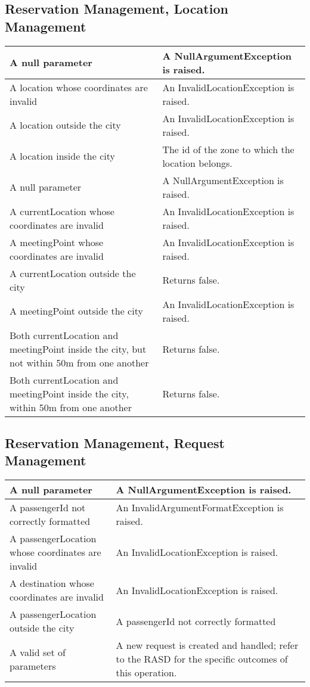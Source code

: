 \subsection{Reservation Management, Location Management}
\begin{tabular}{p{5cm}|p{6cm}}
\hline
	\method{getZone(location)}
	A null parameter &
	A NullArgumentException is raised.\\\hline
	A location whose coordinates are invalid &
	An InvalidLocationException is raised. \\\hline
	A location outside the city &
	An InvalidLocationException is raised. \\\hline
	A location inside the city &
	The id of the zone to which the location belongs. \\\hline
			
	\method{checkTaxiDriverLocation(currentLocation, meetingPoint)}
	A null parameter &
	A NullArgumentException is raised. \\\hline
	A currentLocation whose coordinates are invalid &
	An InvalidLocationException is raised. \\\hline
	A meetingPoint whose coordinates are invalid &
	An InvalidLocationException is raised. \\\hline
	A currentLocation outside the city &
	Returns false. \\\hline
	A meetingPoint outside the city & 
	An InvalidLocationException is raised. \\\hline
	Both currentLocation and meetingPoint inside the city, but not within 50m from one another &
	Returns false. \\\hline
	Both currentLocation and meetingPoint inside the city, within 50m  from one another &
	Returns false. \\\hline\hline
\end{tabular}


\subsection{Reservation Management, Request Management}
\begin{tabular}{p{5cm}|p{6cm}}
\hline
	\method{requestTaxi(passengerId, passengerLocation, destination)}
	A null parameter &
	A NullArgumentException is raised.\\\hline
	A passengerId not correctly formatted &
	An InvalidArgumentFormatException is raised. \\\hline
	A passengerLocation whose coordinates are invalid &
	An InvalidLocationException is raised. \\\hline
	A destination whose coordinates are invalid &
	An InvalidLocationException is raised. \\\hline
	A passengerLocation outside the city &
	A passengerId not correctly formatted \\\hline
	A valid set of parameters &
	A new request is created and handled; refer to the RASD for the specific outcomes of this operation. \\\hline\hline
\end{tabular}


